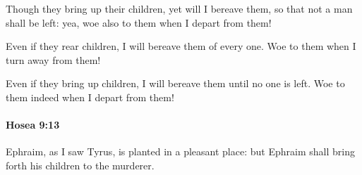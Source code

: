 			\begin{versebox}
					\item[BHS] 
					\item[LXX] 
					\item[ASV] Though they bring up their children, yet will I bereave them, so that not a man shall be left: yea, woe also to them when I depart from them!
					\item[NIV] Even if they rear children, I will bereave them of every one. Woe to them when I turn away from them!
					\item[NRSV] Even if they bring up children, I will bereave them until no one is left. Woe to them indeed when I depart from them!
			\end{versebox}

		\paragraph{Hosea 9:13} %
			\label{HOSEA-9-13}

			Ephraim, as I saw Tyrus, is planted in a pleasant place: but Ephraim shall bring forth his children to the murderer.

